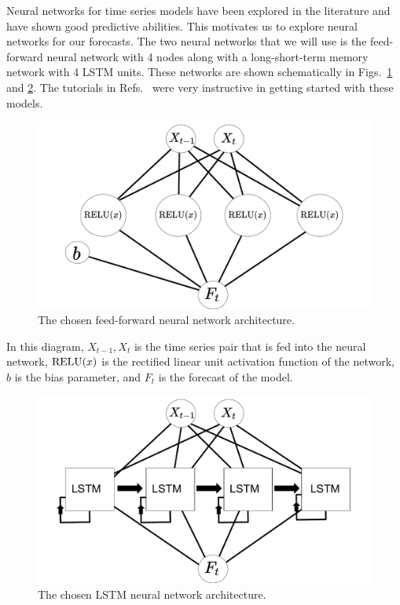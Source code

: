 \documentclass[10pt,a4paper]{article}
\begin{document}
Neural networks for time series models have been explored in the literature  \cite{Adhikari_2013,Oancea_2014,Chaudhuri_2016} and have shown good predictive abilities. This motivates us to explore neural networks for our forecasts. The two neural networks that we will use is the feed-forward neural network with 4 nodes along with a long-short-term memory network with 4 LSTM units. These networks are shown schematically in Figs.~\ref{fig:FFNN architecture} and \ref{fig:LSTM architecture}. The tutorials in Refs.~\cite{Acatay_2017,Pant_2018,Vincent_2018} were very instructive in getting started with these models.
\begin{figure}[h]
\begin{center}
\includegraphics[scale=0.4]{Neural_net_schematic_FFNN.pdf}
\caption{The chosen feed-forward neural network architecture.}
\label{fig:FFNN architecture}
\centering
\end{center}
\end{figure}
In this diagram, ${X_{t-1},X_{t}}$ is the time series pair that is fed into the neural network, ${\rm RELU}(x)$ is the rectified linear unit activation function of the network, $b$ is the bias parameter, and $F_{t}$ is the forecast of the model.
\begin{figure}[h]
\begin{center}
\includegraphics[scale=0.4]{Neural_net_schematic_LSTM.pdf}
\caption{The chosen LSTM neural network architecture.}
\label{fig:LSTM architecture}
\centering
\end{center}
\end{figure}
\end{document}
